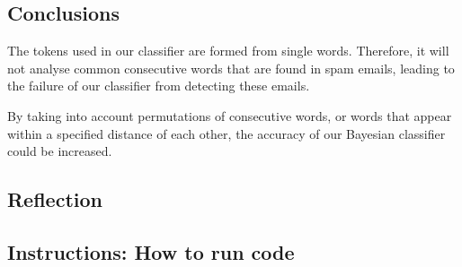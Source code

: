 \documentclass[10pt, a4paper]{article}
\begin{document}
\subsection*{Conclusions}

The tokens used in our classifier are formed from single words. Therefore, it will not analyse common consecutive words that are found in spam emails, leading to the failure of our classifier from detecting these emails. 

By taking into account permutations of consecutive words, or words that appear within a specified distance of each other, the accuracy of our Bayesian classifier could be increased. 

\subsection*{Reflection}

\subsection*{Instructions: How to run code}
\end{document}
